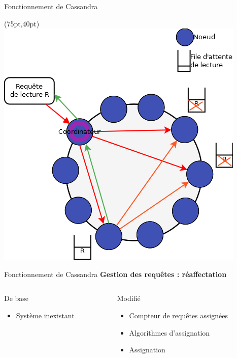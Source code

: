 \documentclass{beamer}
\newcommand{\success}{\color{SuccessGreen}\CheckmarkBold}
\newcommand{\fail}{\color{FailedRed}\XSolidBold}
\begin{document}
\begin{frame}{Fonctionnement de Cassandra}
\begin{textblock*}{\paperwidth}(75pt,40pt)
    \includegraphics[scale=0.43]{request}
\end{textblock*}
\end{frame}

\begin{frame}{Fonctionnement de Cassandra}
\textbf{Gestion des requêtes : réaffectation}
\begin{columns}
\begin{column}[c]{5cm}
\begin{block}{De base}
\begin{itemize}
	\item Système inexistant
\end{itemize}
\end{block}
\end{column}

\begin{column}[c]{5cm}
\begin{block}{Modifié}
\begin{itemize}
	\item[\success] Compteur de requêtes assignées
	\item[\fail] Algorithmes d'assignation
	\item[\fail] Assignation
\end{itemize}
\end{block}
\end{column}
\end{columns}
\end{frame}
\end{document}
